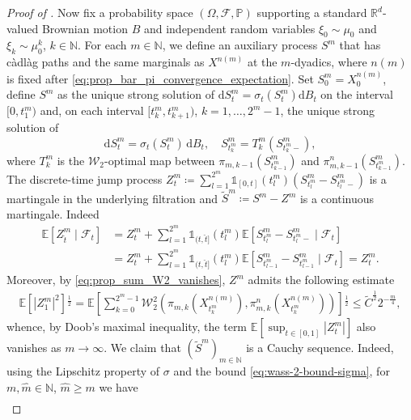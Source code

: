 \documentclass[12pt,oneside]{amsart}
\theoremstyle{definition}
\newcommand{\F}{\mathcal F}
\newcommand{\D}{\mathrm{d}}
\newcommand{\N}{\mathbb N}
\newcommand{\R}{\mathbb R}
\def\P{{\mathbb P}}
\def\R{{\mathbb R}}
\numberwithin{equation}{section}
\begin{document}
\begin{proof}[Proof of ]
Now fix a probability space $(\Omega, \F, \P)$ supporting a standard $\R^d$-valued Brownian motion $B$ and independent random variables $\xi_0 \sim \mu_0$ and $\xi_k \sim \mu^k_0$, $k \in \N$.
For each $m \in \N$, we define an auxiliary process $S^m$ that has c\`adl\`ag paths and the same marginals as $X^{n(m)}$ at the $m$-dyadics, where $n(m)$ is fixed after \eqref{eq:prop_bar_pi_convergence_expectation}.
Set $S_0^m = X_0^{n(m)}$, define $S^m$ as the unique strong solution of $\D S^m_t = \sigma_t(S^m_t) \D B_t$ on the interval $[0, t^m_1)$ and, on each interval $[t^m_k, t^m_{k + 1})$, $k = 1,\ldots,2^m-1$, the unique strong solution of 
\begin{equation}
    \label{eq:prop_S_m_definition}
   \D S_t^m = \sigma_t(S_t^m) \, \D B_t, \quad S_{t^m_{k}}^m = T^m_k(S^m_{t^m_{k}-}),
\end{equation}
where $T^m_k$ is the $\mathcal W_2$-optimal map between $\pi_{m, k - 1}(S_{t^m_{k-1}}^m)$ and $\pi^n_{m,k - 1}(S_{t^m_{k-1}}^m)$.
The discrete-time jump process $Z^{m}_{t} \coloneqq \sum_{l = 1}^{2^m} \mathds 1_{[0,t]}(t^m_{l})(S_{t^m_{l}}^{m} - S_{t^{m}_{l}-}^{m})$ is a martingale in the underlying filtration and $\tilde S^m \coloneqq S^{m} - Z^{m}$ is a continuous martingale.
Indeed
\begin{align}
    \mathbb E \!\left[ Z^{m}_{\hat t} \mid \mathcal F_t \right]\! 
    &= 
    Z_t^{m} + \sum_{l = 1}^{2^m} \mathds 1_{(t,\hat t]}(t^m_{l})\mathbb E \!\left[ S_{t^m_{l}}^{m} - S_{t^m_{l}-}^{m} \mid \mathcal F_t \right]\! 
    \\
    &= Z_t^{m} +  \sum_{l = 1}^{2^m} \mathds 1_{(t,\hat t]}(t^m_{l}) \mathbb E \!\left[ S_{t^m_{l-1}}^{m} - S_{t^m_{l-1}}^{m} \mid \mathcal F_t \right]\! = Z_t^{m}.
\end{align}
Moreover, by \eqref{eq:prop_sum_W2_vanishes}, $Z^{m}$ admits the following estimate
\begin{align}
    \mathbb E \!\left[ | Z^{m}_1 |^2 \right]\!^\frac12 
    = \mathbb E \!\left[ \sum_{k = 0}^{2^m-1} \mathcal W_2^2\!\left(\pi_{m,k}(X^{n(m)}_{t^m_k}),\pi^{n}_{m,k}(X_{t^m_k}^{n(m)})\right)\! \right]\!^\frac12 
    \le
    \tilde C^\frac12 2^{- \frac{m}{4}},
\end{align}
whence, by Doob's maximal inequality, the term $\mathbb E [\sup_{t \in [0,1]} |Z^m_t|]$ also vanishes as $m \to \infty$.
We claim that $(\tilde S^{m})_{m \in \N}$ is a Cauchy sequence.
Indeed, using the Lipschitz property of $\sigma$ and the bound \eqref{eq:wass-2-bound-sigma}, for $m, \hat m \in \N$, $\hat m \ge m$ we have
\begin{align}

\end{align}
\end{proof}
\end{document}

